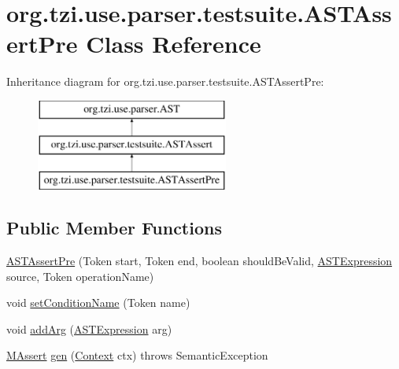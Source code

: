 \hypertarget{classorg_1_1tzi_1_1use_1_1parser_1_1testsuite_1_1_a_s_t_assert_pre}{\section{org.\-tzi.\-use.\-parser.\-testsuite.\-A\-S\-T\-Assert\-Pre Class Reference}
\label{classorg_1_1tzi_1_1use_1_1parser_1_1testsuite_1_1_a_s_t_assert_pre}
}
Inheritance diagram for org.\-tzi.\-use.\-parser.\-testsuite.\-A\-S\-T\-Assert\-Pre\-:\begin{figure}[H]
\begin{center}
\leavevmode
\includegraphics[height=3.000000cm]{classorg_1_1tzi_1_1use_1_1parser_1_1testsuite_1_1_a_s_t_assert_pre}
\end{center}
\end{figure}
\subsection*{Public Member Functions}
\begin{DoxyCompactItemize}
\item 
\hyperlink{classorg_1_1tzi_1_1use_1_1parser_1_1testsuite_1_1_a_s_t_assert_pre_ae390c2ad52ca533127a3c02d363afa6e}{A\-S\-T\-Assert\-Pre} (Token start, Token end, boolean should\-Be\-Valid, \hyperlink{classorg_1_1tzi_1_1use_1_1parser_1_1ocl_1_1_a_s_t_expression}{A\-S\-T\-Expression} source, Token operation\-Name)
\item 
void \hyperlink{classorg_1_1tzi_1_1use_1_1parser_1_1testsuite_1_1_a_s_t_assert_pre_a70857c52812a0797adc9b3afb66f28d4}{set\-Condition\-Name} (Token name)
\item 
void \hyperlink{classorg_1_1tzi_1_1use_1_1parser_1_1testsuite_1_1_a_s_t_assert_pre_aafe5688b7ad86a3a8843af7c3fd45718}{add\-Arg} (\hyperlink{classorg_1_1tzi_1_1use_1_1parser_1_1ocl_1_1_a_s_t_expression}{A\-S\-T\-Expression} arg)
\item 
\hyperlink{classorg_1_1tzi_1_1use_1_1uml_1_1sys_1_1testsuite_1_1_m_assert}{M\-Assert} \hyperlink{classorg_1_1tzi_1_1use_1_1parser_1_1testsuite_1_1_a_s_t_assert_pre_a493c5c6940cd167c56e4f1f988b20a10}{gen} (\hyperlink{classorg_1_1tzi_1_1use_1_1parser_1_1_context}{Context} ctx)  throws Semantic\-Exception 
\end{DoxyCompactItemize}


